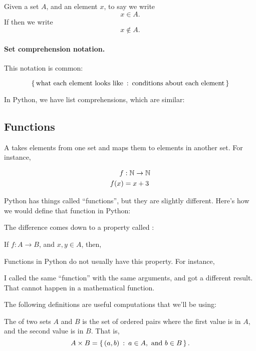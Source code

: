 Given a set $A$, and an element $x$, to say  we write $$x \in A.$$ If  then we write $$x \notin A.$$

\paragraph{Set comprehension notation.}

This notation is common:

\begin{equation*}
  \left\{\, \text{what each element looks like} \::\: \text{conditions about
      each element} \,\right\}
\end{equation*}

In Python, we have list comprehensions, which are similar:


\subsection{Functions}

A  takes elements from one set and maps
them to elements in another set. For instance,

\begin{align*}
  f & : \mathbb{N} \to \mathbb{N} \\
  f(x) & = x + 3
\end{align*}

Python has things called ``functions'', but they are slightly
different. Here's how we would define that function in Python:


The difference comes down to a property called :

\begin{axiom}
  If $f : A \to B$, and $x, y \in A$, then, 
\end{axiom}

Functions in Python do not usually have this property. For instance,


I called the same ``function'' with the same arguments, and got a
different result. That cannot happen in a mathematical function.

The following definitions are useful computations that we'll be using:

\begin{definition}
  The  of two sets $A$ and $B$ is the set of
  ordered pairs where the first value is in $A$, and the second value
  is in $B$. That is,
  $$A \times B = \left\{\, (a, b) \::\: a \in A, \text{ and } b \in B \,\right\}.$$
\end{definition}

